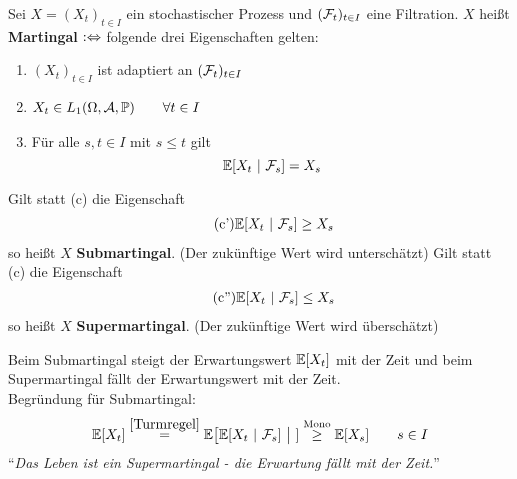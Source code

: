\begin{defi}[Martingal]\enter
Sei $X=(X_t)_{t\in I}$ ein stochastischer Prozess und $(\mathcal{F}_t)_{t\in I}$ eine Filtration. $X$ heißt \textbf{Martingal} $:\Leftrightarrow$ folgende drei Eigenschaften gelten:
\begin{enumerate}[label=(\alph*)]
\item $(X_t)_{t\in I}$ ist adaptiert an $(\mathcal{F}_t)_{t\in I}$
\item $\begin{aligned}
		X_t\in L_1(\Omega,\mathcal{A},\mathbb{P}) \qquad \forall t\in I
\end{aligned}$
\item Für alle $s,t\in I$ mit $s\leq t$ gilt
	\[ \mathbb{E}[X_t~|~\mathcal{F}_s]=X_s \]
\end{enumerate}
Gilt statt (c) die Eigenschaft
\begin{align}\label{defSubmartingal}\tag{c'}
\mathbb{E}[X_t~|~\mathcal{F}_s]\geq X_s
\end{align}
so heißt $X$ \textbf{Submartingal}. (Der zukünftige Wert wird unterschätzt) \enter Gilt statt (c) die Eigenschaft
\begin{align}\label{defSupermartingal}\tag{c''}
\mathbb{E}[X_t~|~\mathcal{F}_s]\leq X_s
\end{align}
so heißt $X$ \textbf{Supermartingal}. (Der zukünftige Wert wird überschätzt)\\
\end{defi}

\begin{bemerkung}
Beim Submartingal steigt der Erwartungswert $\mathbb{E}[X_t]$ mit der Zeit und beim Supermartingal fällt der Erwartungswert mit der Zeit.\\
Begründung für Submartingal:
\begin{align*}
\mathbb{E}[X_t]\stackrel{\eqref{Turmregel}}{=}
\mathbb{E}\big[\mathbb{E}[X_t~|~\mathcal{F}_s]~\big|~]\stackrel{\text{Mono}}{\geq}\mathbb{E}[X_s]\qquad s\in I
\end{align*}
``\textit{Das Leben ist ein Supermartingal - die Erwartung fällt mit der Zeit.}''
\end{bemerkung}
